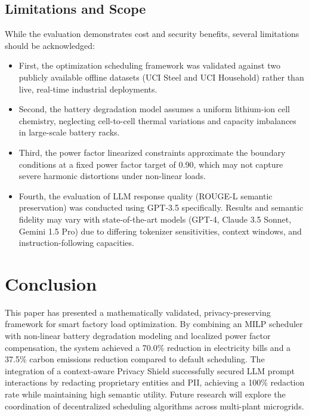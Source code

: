 \documentclass[journal]{IEEEtran}
\begin{document}
\subsection{Limitations and Scope}
While the evaluation demonstrates cost and security benefits, several limitations should be acknowledged:
\begin{itemize}
\item First, the optimization scheduling framework was validated against two publicly available offline datasets (UCI Steel and UCI Household) rather than live, real-time industrial deployments.
\item Second, the battery degradation model assumes a uniform lithium-ion cell chemistry, neglecting cell-to-cell thermal variations and capacity imbalances in large-scale battery racks.
\item Third, the power factor linearized constraints approximate the boundary conditions at a fixed power factor target of 0.90, which may not capture severe harmonic distortions under non-linear loads.
\item Fourth, the evaluation of LLM response quality (ROUGE-L semantic preservation) was conducted using GPT-3.5 specifically. Results and semantic fidelity may vary with state-of-the-art models (GPT-4, Claude 3.5 Sonnet, Gemini 1.5 Pro) due to differing tokenizer sensitivities, context windows, and instruction-following capacities.
\end{itemize}

\section{Conclusion}
This paper has presented a mathematically validated, privacy-preserving framework for smart factory load optimization. By combining an MILP scheduler with non-linear battery degradation modeling and localized power factor compensation, the system achieved a 70.0\% reduction in electricity bills and a 37.5\% carbon emissions reduction compared to default scheduling. The integration of a context-aware Privacy Shield successfully secured LLM prompt interactions by redacting proprietary entities and PII, achieving a 100\% redaction rate while maintaining high semantic utility. Future research will explore the coordination of decentralized scheduling algorithms across multi-plant microgrids.
\end{document}
